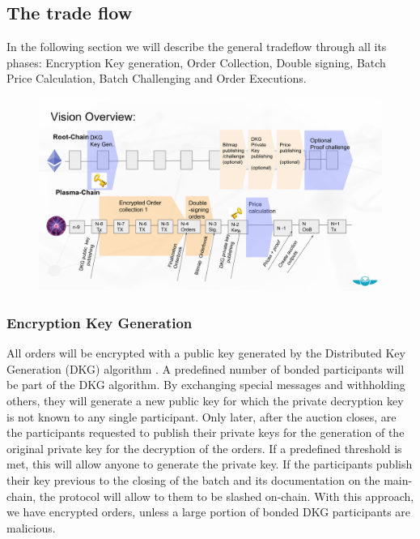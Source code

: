 \documentclass[11pt,parskip=full]{scrartcl}%
\begin{document}
\subsection{The trade flow}
\label{subsec:data}

In the following section we will describe the general tradeflow through all its phases: Encryption Key generation, Order Collection, Double signing, Batch Price Calculation, Batch Challenging and Order Executions.

\begin{figure}
\centering
\includegraphics[width=\textwidth]{overview_tradeflow.png}
\end{figure}



\subsubsection{Encryption Key Generation}
All orders will be encrypted with a public key generated by the Distributed Key Generation (DKG) algorithm \cite{DKG}.
A predefined number of bonded participants will be part of the DKG algorithm.
By exchanging special messages and withholding others, they will generate a new public key for which the private decryption key is not known to any single participant.
Only later, after the auction closes, are the participants requested to publish their private keys for the generation of the original private key for the decryption of the orders.
If a predefined threshold is met, this will allow anyone to generate the private key.
If the participants publish their key previous to the closing of the batch and its documentation on the main-chain, the protocol will allow to them to be slashed on-chain.
With this approach, we have encrypted orders, unless a large portion of bonded DKG participants are malicious.
\end{document}

